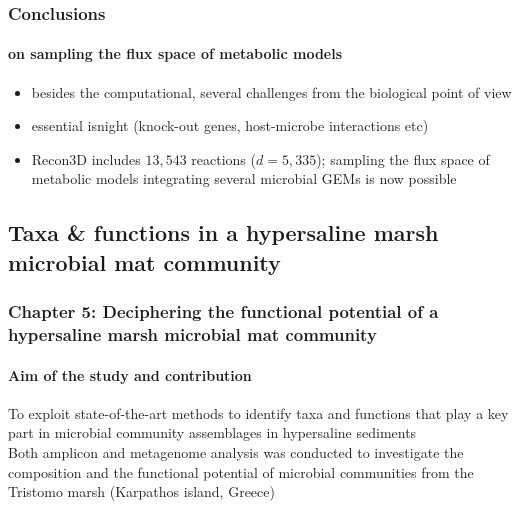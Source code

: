 \documentclass{beamer}
\begin{document}
   \begin{frame}
      \frametitle{Conclusions}
      \framesubtitle{on sampling the flux space of metabolic models}
      
      \begin{itemize}
         \item besides the computational, several challenges from the biological point of view
         \item essential isnight (knock-out genes, host-microbe interactions etc)
         \item Recon3D includes $13,543$ reactions ($d=5,335$); sampling the flux space of metabolic models integrating several microbial GEMs is now possible
      \end{itemize}
   \end{frame}

   \begin{darkframes}
      \section{
         Taxa \& functions in a hypersaline marsh microbial mat community
      }

      \begin{frame}
         \frametitle{\textbf{Chapter 5:} Deciphering the functional potential of a hypersaline marsh microbial mat community}
         \framesubtitle{Aim of the study and contribution}

         To exploit state-of-the-art methods to identify taxa and functions that play a key
         part in microbial community assemblages in hypersaline sediments \\ \bigskip 
         Both amplicon and metagenome analysis was conducted to investigate the composition and the functional 
         potential of microbial communities from the Tristomo marsh (Karpathos island, Greece)
      \end{frame}

   \end{darkframes}
\end{document}
